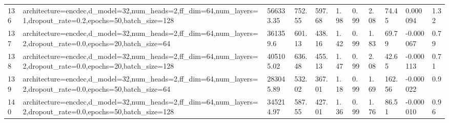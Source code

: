 \begin{longtable}{C{0.8cm} L{2cm} C{1.15cm} C{1.15cm} C{1.15cm} C{1.15cm} C{0.85cm} C{1.25cm} C{1.2cm} C{1.5cm} C{1.0cm}}
136 & architecture=encdec,\newline d\_model=32,\newline num\_heads=2,\newline ff\_dim=64,\newline num\_layers=1,\newline dropout\_rate=0.2,\newline epochs=50,\newline batch\_size=128 & 566333.35 & 752.55 & 597.68 & 1.98 & 0.99 & 2.08 & 74.45 & 0.000094 & 1.32 \\
137 & architecture=encdec,\newline d\_model=32,\newline num\_heads=2,\newline ff\_dim=64,\newline num\_layers=2,\newline dropout\_rate=0.0,\newline epochs=20,\newline batch\_size=64 & 361359.6 & 601.13 & 438.16 & 1.42 & 0.99 & 1.83 & 69.79 & -0.000067 & 0.79 \\
138 & architecture=encdec,\newline d\_model=32,\newline num\_heads=2,\newline ff\_dim=64,\newline num\_layers=2,\newline dropout\_rate=0.0,\newline epochs=20,\newline batch\_size=128 & 405105.02 & 636.48 & 455.13 & 1.47 & 0.99 & 2.08 & 42.65 & -0.000113 & 0.71 \\
139 & architecture=encdec,\newline d\_model=32,\newline num\_heads=2,\newline ff\_dim=64,\newline num\_layers=2,\newline dropout\_rate=0.0,\newline epochs=50,\newline batch\_size=64 & 283045.89 & 532.02 & 367.01 & 1.18 & 0.99 & 1.69 & 162.56 & -0.000022 & 0.9 \\
140 & architecture=encdec,\newline d\_model=32,\newline num\_heads=2,\newline ff\_dim=64,\newline num\_layers=2,\newline dropout\_rate=0.0,\newline epochs=50,\newline batch\_size=128 & 345214.97 & 587.55 & 427.01 & 1.36 & 0.99 & 1.76 & 86.51 & -0.000010 & 0.96 \\

\end{longtable}
